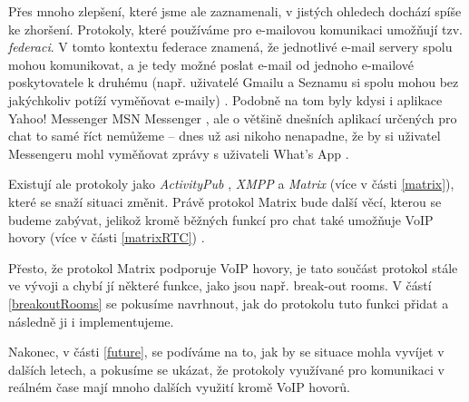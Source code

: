 Přes mnoho zlepšení, které jsme ale zaznamenali, v jistých ohledech dochází
spíše ke zhoršení. Protokoly, které používáme pro e-mailovou komunikaci umožňují
tzv. \textit{federaci}. V tomto kontextu federace znamená, že jednotlivé e-mail
servery spolu mohou komunikovat, a je tedy možné poslat e-mail od jednoho
e-mailové poskytovatele k druhému (např. uživatelé Gmailu a Seznamu si spolu
mohou bez jakýchkoliv potíží vyměňovat e-maily) \cite{MatrixORG-FAQ}. Podobně na
tom byly kdysi i aplikace Yahoo! Messenger MSN Messenger
\cite{BetaNews-MSYahooToLinkIMNets}, ale o většině dnešních aplikací určených
pro chat to samé říct nemůžeme -- dnes už asi nikoho nenapadne, že by si
uživatel Messengeru mohl vyměňovat zprávy s uživateli What's App
\cite{9To5Mac-InteroperabilityNightmareAndDream}.

Existují ale protokoly jako \textit{ActivityPub} \cite{W3ORG-ActivityPub},
\textit{XMPP} \cite{XMPPORG-Homepage} a \textit{Matrix}
\cite{MatrixORG-Homepage} (více v části \ref{matrix}), které se snaží situaci
změnit. Právě protokol Matrix bude další věcí, kterou se budeme zabývat, jelikož
kromě běžných funkcí pro chat také umožňuje VoIP hovory (více v části
\ref{matrixRTC}) \cite{MatrixORG-Homepage}.

Přesto, že protokol Matrix podporuje VoIP hovory, je tato součást protokol stále
ve vývoji \cite{GitHub-MSC3401,GitHub-MSC3898} a chybí jí některé funkce, jako jsou např.
break-out rooms. V částí \ref{breakoutRooms} se pokusíme navrhnout, jak do
protokolu tuto funkci přidat a následně ji i implementujeme.

Nakonec, v části \ref{future}, se podíváme na to, jak by se situace mohla
vyvíjet v dalších letech, a pokusíme se ukázat, že protokoly využívané pro
komunikaci v reálném čase mají mnoho dalších využití kromě VoIP hovorů.
